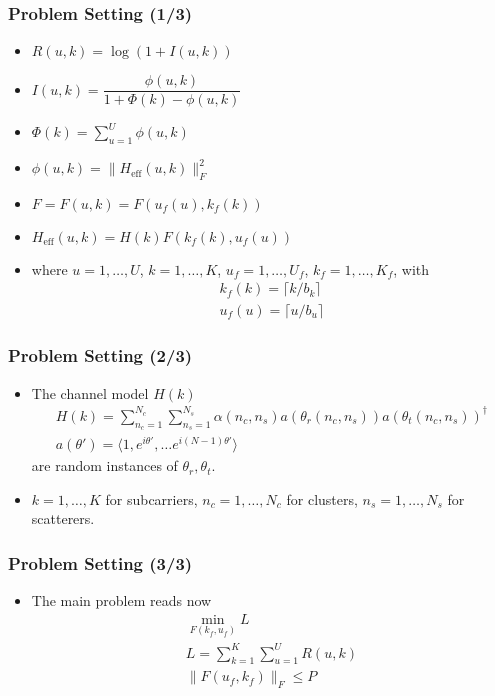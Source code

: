 \documentclass{beamer}
\begin{document}
\begin{frame}
	\frametitle{Problem Setting (1/3)}
	\begin{itemize}
	\item \(R(u,k) =\log(1 +I(u,k))\)
	\item \(I(u,k) =\dfrac{\phi(u,k)}{1 +\Phi(k) -\phi(u,k)}\)

	\item \(\Phi(k) =\sum_{u=1}^U \phi(u,k)\)
	\item \(\phi(u,k) =\|H_{\mathrm{eff}}(u,k)\|_F^2\)
	\item \(F =F(u,k) =F(u_f(u), k_f(k))\)
	\item \(H_{\mathrm{eff}}(u,k) =H(k) F(k_f(k),u_f(u))\)
	\item where \(u =1,\dotsc,U\), \(k =1,\dotsc,K\), \(u_f =1,\dotsc,U_f\), \(k_f =1,\dotsc,K_f\), with
	\begin{gather*}
    k_f(k) =\lceil k/b_k \rceil \\
    u_f(u) =\lceil u/b_u \rceil
	\end{gather*}
	\end{itemize}
	
\end{frame}


\begin{frame}
	\frametitle{Problem Setting (2/3)}
	\begin{itemize}
\item The channel model \(H(k)\)
	\begin{gather*}
H(k) =\sum_{n_c=1}^{N_c} \sum_{n_s=1}^{N_s} \alpha(n_c,n_s) a(\theta_r(n_c,n_s)) a(\theta_t(n_c,n_s))^\dagger \\
a(\theta') =\langle 1, e^{i \theta'}, \dotsc e^{i (N-1) \theta'} \rangle
	\end{gather*}
	are random instances of \(\theta_r, \theta_t\).
	\item \(k =1,\dotsc,K\) for subcarriers, \(n_c =1,\dotsc,N_c\) for clusters, \(n_s =1,\dotsc,N_s\) for scatterers.
	\end{itemize}
\end{frame}


\begin{frame}
	\frametitle{Problem Setting (3/3)}
	\begin{itemize}
	\item The main problem reads now
	\begin{gather*}
\min_{F(k_f,u_f)} L \\
L =\sum_{k=1}^K \sum_{u=1}^U R(u,k) \\
\|F(u_f,k_f)\|_F \leq P
	\end{gather*}
	\end{itemize}
\end{frame}
\end{document}
